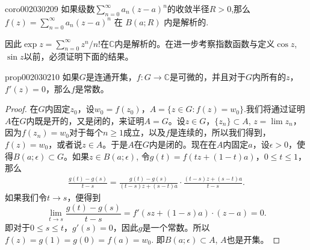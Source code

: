 \begin{corollary}{}{coro002030209}
如果级数$\sum\limits_{n=0}^{\infty}{a_n(z-a)^n}$的收敛半径$R>0$,那么$f(z)=\sum\limits_{n=0}^{\infty}{a_n(z-a)^n}$ 在 $B(a; R)$ 内是解析的.
\end{corollary}

因此$\exp{z} = \sum\limits_{n=0}^{\infty}{z^n/n!}$在$\mathbb{C}$内是解析的。在进一步考察指数函数与定义$\cos{z}$, $\sin{z}$以前，必须证明下面的结果。

\begin{proposition}{}{prop002030210}
如果$G$是连通开集，$f: G \to \mathbb{C}$是可微的，并且对于$G$内所有的$z$，$f'(z)=0$，那么$f$是常数。
\end{proposition}

\begin{proof}
在$G$内固定$z_0$，设$w_0 = f(z_0)$，$A = \{z \in G: f(z)=w_0\}$.我们将通过证明$A$在$G$内既是开的，又是闭的，来证明$A = G$。设$z \in G$，$\{z_n\} \subset A$, $z = \lim{z_n}$，因为$f(z_n) = w_0$对于每个$n \ge 1$成立，以及$f$是连续的，所以我们得到，$f(z)=w_0$，或者说$z \in A$。于是$A$在$G$内是闭的。现在在$A$内固定$a$，设$\epsilon > 0$，使得$B(a;\epsilon) \subset G$。如果$z \in B(a;\epsilon)$, 令$g(t) = f(tz + (1-t)a)$，$0 \le t \le 1$，那么
\begin{gather}\label{equ002030211}
\frac{g(t)-g(s)}{t - s} = \frac{g(t)-g(s)}{(t-s)z + (s-t)a} \cdot \frac{(t-s)z + (s-t)a}{t - s}.
\end{gather}
如果我们令$t \to s$，便得到
\[
\lim_{t \to s}{\frac{g(t)-g(s)}{t - s}} = f'(sz + (1-s)a) \cdot (z-a) = 0.
\]
即对于$0 \le s \le t$，$g'(s) = 0$，因此$g$是一个常数。所以$f(z)=g(1) = g(0) = f(a)=w_0$. 即$B(a; \epsilon) \subset A$, $A$也是开集。
\end{proof}

